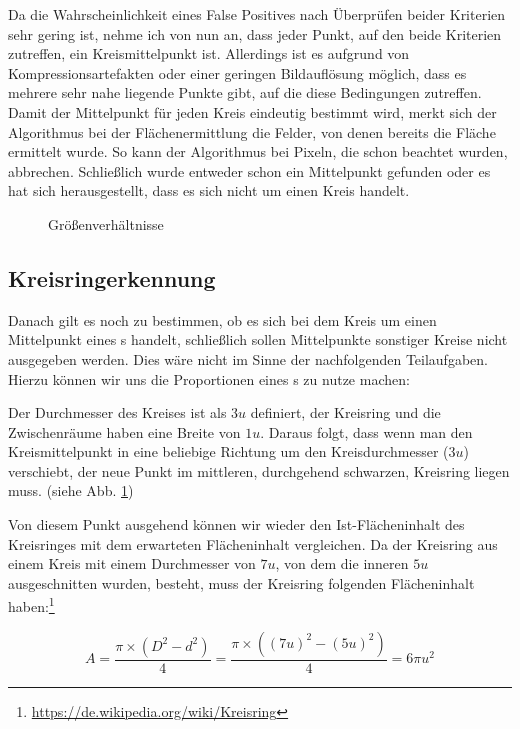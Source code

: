 Da die Wahrscheinlichkeit eines False Positives nach Überprüfen beider Kriterien sehr gering ist, nehme ich von nun an, dass jeder Punkt, auf den beide Kriterien zutreffen, ein Kreismittelpunkt ist. Allerdings ist es aufgrund von Kompressionsartefakten oder einer geringen Bildauflösung möglich, dass es mehrere sehr nahe liegende Punkte gibt, auf die diese Bedingungen zutreffen. Damit der Mittelpunkt für jeden Kreis eindeutig bestimmt wird, merkt sich der Algorithmus bei der Flächenermittlung die Felder, von denen bereits die Fläche ermittelt wurde. So kann der Algorithmus bei Pixeln, die schon beachtet wurden, abbrechen. Schließlich wurde entweder schon ein Mittelpunkt gefunden oder es hat sich herausgestellt, dass es sich nicht um einen Kreis handelt.

\begin{figure}
  \centering
  
  \caption{Größenverhältnisse}
  \label{abb:dims}
\end{figure}

\subsection{Kreisringerkennung}
Danach gilt es noch zu bestimmen, ob es sich bei dem Kreis um einen Mittelpunkt eines \task{}s handelt, schließlich sollen Mittelpunkte sonstiger Kreise nicht ausgegeben werden. Dies wäre nicht im Sinne der nachfolgenden Teilaufgaben. Hierzu können wir uns die Proportionen eines \task{}s zu nutze machen:

Der Durchmesser des Kreises ist als \(3u\) definiert, der Kreisring und die Zwischenräume haben eine Breite von \(1u\). Daraus folgt, dass wenn man den Kreismittelpunkt in eine beliebige Richtung um den Kreisdurchmesser (\(3u\)) verschiebt, der neue Punkt im mittleren, durchgehend schwarzen, Kreisring liegen muss. (siehe Abb. \ref{abb:dims})

Von diesem Punkt ausgehend können wir wieder den Ist-Flächeninhalt des Kreisringes mit dem erwarteten Flächeninhalt vergleichen. Da der Kreisring aus einem Kreis mit einem Durchmesser von \(7u\), von dem die inneren \(5u\) ausgeschnitten wurden, besteht, muss der Kreisring folgenden Flächeninhalt haben:\footnote{\url{https://de.wikipedia.org/wiki/Kreisring}}

\begin{equation}
	A=\frac{\pi{}\times(D^2-d^2)}{4}=\frac{\pi{}\times((7u)^2-(5u)^2)}{4}=6\pi{}u^2
\end{equation}

